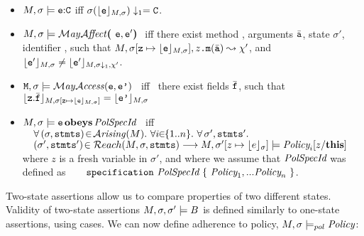\begin{itemize}
  \item
 $\M,\sigma  \models  \syntax{\sE}\kw{:}\prg{C}$ iff  $\sigma(\interp{ \syntax{\sE}}{\M,\sigma})\downarrow_1 = \prg{C}$.
 
 \item 
$\M,\sigma  \models \MayAffect \lp\syntax{\sE},\syntax{\sE'}\rp$ iff  
there exist  method , arguments $\bar{\prg{a}}$, state $\sigma'$, identifier , such that
    $ \M, \sigma[\prg{z}\mapsto \interp {\syntax{\sE}} {\M,\sigma}], \syntax{z}\prg{.m}(\bar{\prg{a}}) \leadsto   \chi'$, and   $\interp {\syntax{\sE'}} {\M,\sigma} \neq  \interp {\syntax{\toby{\sE'}}} {\M,\sigma\downarrow_1,\chi'}    $.
\item
$\Prog{},\sigma \models { \MayAccess}(\prg{\sE},\prg{\sE'})$   \ iff \  there exist  fields $\bar{\prg{f}}$, %
  such that
     $\interp{\prg{z}.\ensuremath{\bar{\prg{f}}}}{\M,\sigma[\prg{z}\mapsto \interp {\syntax{\sE}} {\M,\sigma}]}= \interp {\prg{\sE'} }{\M,\sigma}$
  \item
$\M, \sigma  \models \sE \obeys \PolSpecId   $ \  iff  \\
\SP  $\ \ \   \forall\, (\sigma,\code)\!\in\!\Arising(M).\   \forall  i\!\!\in\! \!\{1..n\}. \ \forall\,\sigma',\code'.$  \\
\SP  $\ \ \    (\sigma',\code')\! \in \Reach(M,\sigma,\code)  \longrightarrow    M, \sigma'[z\mapsto\interp{e}{\sigma}]  \models \Policy_i[ z / {\kw{this}}]$ \\
where $z$ is a fresh variable in $\sigma'$, and where
 we assume that $\PolSpecId$ was defined as \ \  %
$ \ \prg{specification}\ \PolSpecId\  \{\ \Policy_1, ... \Policy_n\ \}$. \\
\end{itemize}

Two-state assertions allow us to compare properties of two different
states. Validity of two-state assertions $\M,\sigma,\sigma' \models \B$
is defined similarly to one-state assertions, using cases.
%
We can now define adherence to policy, $\M,\sigma \models_{pol}  \Policy$:

